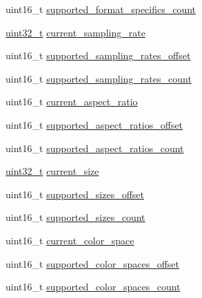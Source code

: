 \begin{DoxyCompactItemize}
\item 
uint16\+\_\+t \hyperlink{structjdksavdecc__descriptor__video__unit__cluster_a3fcf29c535a8155899a04ec7d49fed92}{supported\+\_\+format\+\_\+specifics\+\_\+count}
\item 
\hyperlink{parse_8c_a6eb1e68cc391dd753bc8ce896dbb8315}{uint32\+\_\+t} \hyperlink{structjdksavdecc__descriptor__video__unit__cluster_a081e14c5c832a659daf22003ed8e918d}{current\+\_\+sampling\+\_\+rate}
\item 
uint16\+\_\+t \hyperlink{structjdksavdecc__descriptor__video__unit__cluster_a07e4720cf58229a78c3c0939837b6228}{supported\+\_\+sampling\+\_\+rates\+\_\+offset}
\item 
uint16\+\_\+t \hyperlink{structjdksavdecc__descriptor__video__unit__cluster_a976ed67e20174bbc1a9988dc8f577fd8}{supported\+\_\+sampling\+\_\+rates\+\_\+count}
\item 
uint16\+\_\+t \hyperlink{structjdksavdecc__descriptor__video__unit__cluster_a37e093dd240216552aa87a2d2feaa310}{current\+\_\+aspect\+\_\+ratio}
\item 
uint16\+\_\+t \hyperlink{structjdksavdecc__descriptor__video__unit__cluster_a87bb2020a649eb68ce41e714a2d7d838}{supported\+\_\+aspect\+\_\+ratios\+\_\+offset}
\item 
uint16\+\_\+t \hyperlink{structjdksavdecc__descriptor__video__unit__cluster_abe30723a49848d56d0fbca98a1e02ab6}{supported\+\_\+aspect\+\_\+ratios\+\_\+count}
\item 
\hyperlink{parse_8c_a6eb1e68cc391dd753bc8ce896dbb8315}{uint32\+\_\+t} \hyperlink{structjdksavdecc__descriptor__video__unit__cluster_a8444502ec86f883b4c80ebd5b8218b07}{current\+\_\+size}
\item 
uint16\+\_\+t \hyperlink{structjdksavdecc__descriptor__video__unit__cluster_a4de5ca1afb8f583facff9d78d61b98c6}{supported\+\_\+sizes\+\_\+offset}
\item 
uint16\+\_\+t \hyperlink{structjdksavdecc__descriptor__video__unit__cluster_a46e215a11ac96892c1e6a2d520e901c0}{supported\+\_\+sizes\+\_\+count}
\item 
uint16\+\_\+t \hyperlink{structjdksavdecc__descriptor__video__unit__cluster_a135455c45a6c2e37e96118ff6f374d9b}{current\+\_\+color\+\_\+space}
\item 
uint16\+\_\+t \hyperlink{structjdksavdecc__descriptor__video__unit__cluster_a765d0a4a3da2b125e5523cbec6a61251}{supported\+\_\+color\+\_\+spaces\+\_\+offset}
\item 
uint16\+\_\+t \hyperlink{structjdksavdecc__descriptor__video__unit__cluster_a020f3551cc29786237d98e5e70afce8a}{supported\+\_\+color\+\_\+spaces\+\_\+count}
\end{DoxyCompactItemize}



